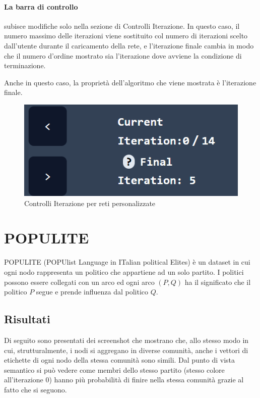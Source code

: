 \documentclass[a4paper,12pt]{report}
\begin{document}
\pagebreak

			\paragraph*{La barra di controllo} subisce modifiche solo nella sezione di Controlli Iterazione. In questo caso, il numero massimo delle iterazioni viene sostituito col numero di iterazioni scelto dall'utente durante il caricamento della rete, e l'iterazione finale cambia in modo che il numero d'ordine mostrato sia l'iterazione dove avviene la condizione di terminazione.
			
			Anche in questo caso, la proprietà dell'algoritmo che viene mostrata è l'iterazione finale.

			\begin{center}
				\begin{figure}[H]
				\centering
				\includegraphics[width=0.5\linewidth]{iterationcontrolcustom}
				\caption{Controlli Iterazione per reti personalizzate}
				\end{figure}
			\end{center}
			

	\section{POPULITE}
		POPULITE (POPUlist Language in ITalian political Elites) è un dataset in cui ogni nodo rappresenta un politico che appartiene ad un solo partito. I politici possono essere collegati con un arco ed ogni arco $(P, Q)$ ha il significato che il politico $P$ segue e prende influenza dal politico $Q$.
		
		\pagebreak
		\subsection{Risultati}	
		Di seguito sono presentati dei screenshot che mostrano che, allo stesso modo in cui, strutturalmente, i nodi si aggregano in diverse comunità, anche i vettori di etichette di ogni nodo della stessa comunità sono simili. Dal punto di vista semantico si può vedere come membri dello stesso partito (stesso colore all'iterazione 0) hanno più probabilità di finire nella stessa comunità grazie al fatto che si seguono.
		
\end{document}

